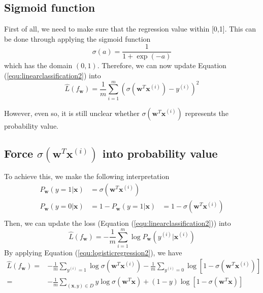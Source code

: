 \subsection*{Sigmoid function} First of all, we need to make sure that the regression value within [0,1]. This can be done through applying the sigmoid function
\begin{equation}
    \sigma(a) = \frac{1}{1+\exp(-a)}
\end{equation}
which has the domain $(0,1)$. Therefore, we can now update Equation (\ref{equ:linearclassification2}) into 
\begin{equation}\label{equ:logisticregression1}
    \hat{L}(f_\textbf{w}) = \frac{1}{m}\sum_{i=1}^m (\sigma(\textbf{w}^T\textbf{x}^{(i)})- y^{(i)})^2
\end{equation}

However, even so, it is still unclear whether $\sigma(\textbf{w}^T\textbf{x}^{(i)})$ represents the probability value. 

\subsection*{Force $\sigma(\textbf{w}^T\textbf{x}^{(i)})$ into probability value} To achieve this, we make the following interpretation 
\begin{equation}\label{equ:logisticregression2}
\begin{array}{lll}
    P_{\textbf{w}}(y=1|\textbf{x}) &  = \sigma(\textbf{w}^T\textbf{x}^{(i)}) & \\
     P_{\textbf{w}}(y=0|\textbf{x}) & = 1- P_{\textbf{w}}(y=1|\textbf{x}) & = 1 - \sigma(\textbf{w}^T\textbf{x}^{(i)})\\
\end{array}
\end{equation}
Then, we can update the loss (Equation (\ref{equ:linearclassification2})) into 
\begin{equation}\label{equ:logisticregression3}
    \hat{L}(f_\textbf{w}) = - \frac{1}{m}\sum_{i=1}^m \log P_{\textbf{w}}(y^{(i)}|\textbf{x}^{(i)})
\end{equation}
By applying Equation (\ref{equ:logisticregression2}), we have 
\begin{equation}\label{equ:logisticregression3}
\begin{array}{rl}
    \hat{L}(f_\textbf{w}) = &  - \displaystyle \frac{1}{m}\sum_{y^{(i)}=1} \log \sigma(\textbf{w}^T\textbf{x}^{(i)}) - \frac{1}{m}\sum_{y^{(i)}=0} \log [1-\sigma(\textbf{w}^T\textbf{x}^{(i)})]\\
    = & - \displaystyle \frac{1}{m} \sum_{(\textbf{x},y)\in D} y\log \sigma(\textbf{w}^T\textbf{x}) + (1-y) \log [1-\sigma(\textbf{w}^T\textbf{x})] 
\end{array}
\end{equation}

